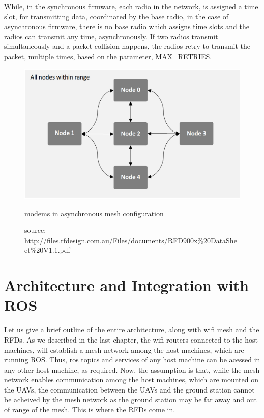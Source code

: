While, in the synchronous firmware, each radio in the network, is assigned a time slot, for transmitting data, coordinated by the base radio, in the case of asynchronous firmware, there is no base radio which assigns time slots and the radios can transmit any time, asynchronously. If two radios transmit simultaneously and a packet collision happens, the radios retry to transmit the packet, multiple times, based on the parameter, MAX\_RETRIES.

\begin{figure}[h]
	\centering
	\includegraphics[scale=0.4]{Pictures/async.png}
	\caption{modems in asynchronous mesh configuration}
	\label{fig: rfdsync}
	\caption*{source: http://files.rfdesign.com.au/Files/documents/RFD900x\%20DataSheet\%20V1.1.pdf}
\end{figure}

\section{Architecture and Integration with ROS}
Let us give a brief outline of the entire architecture, along with wifi mesh and the RFDs. As we described in the last chapter, the wifi routers connected to the host machines, will establish a mesh network among the host machines, which are running ROS. Thus, ros topics and services of any host machine can be acessed in any other host machine, as required. Now, the assumption is that, while the mesh network enables communication among the host machines, which are mounted on the UAVs, the communication between the UAVs and the ground station cannot be acheived by the mesh network as the ground station may be far away and out of range of the mesh. This is where the RFDs come in.

